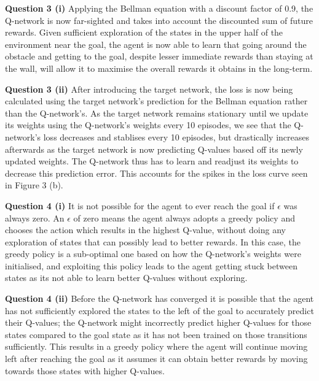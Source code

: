 \documentclass[12pt]{article}
\begin{document}
\vspace{2cm}
\textbf{Question 3 (i)}
Applying the Bellman equation with a discount factor of 0.9, the Q-network is now far-sighted and takes into account the discounted sum of future rewards. Given sufficient exploration of the states in the upper half of the environment near the goal, the agent is now able to learn that going around the obstacle and getting to the goal, despite lesser immediate rewards than staying at the wall, will allow it to maximise the overall rewards it obtains in the long-term.

\vspace{0.5cm}
\textbf{Question 3 (ii)}
After introducing the target network, the loss is now being calculated using the target network's prediction for the Bellman equation rather than the Q-network's. As the target network remains stationary until we update its weights using the Q-network's weights every 10 episodes, we see that the Q-network's loss decreases and stablises every 10 episodes, but drastically increases afterwards as the target network is now predicting Q-values based off its newly updated weights. The Q-network thus has to learn and readjust its weights to decrease this prediction error. This accounts for the spikes in the loss curve seen in Figure 3 (b).

\vspace{2cm}
\textbf{Question 4 (i)}
It is not possible for the agent to ever reach the goal if \(\epsilon\) was always zero. An \(\epsilon\) of zero means the agent always adopts a greedy policy and chooses the action which results in the highest Q-value, without doing any exploration of states that can possibly lead to better rewards. In this case, the greedy policy is a sub-optimal one based on how the Q-network's weights were initialised, and exploiting this policy leads to the agent getting stuck between states as its not able to learn better Q-values without exploring.

\vspace{0.5cm}
\textbf{Question 4 (ii)}
Before the Q-network has converged it is possible that the agent has not  sufficiently explored the states to the left of the goal to accurately predict their Q-values; the Q-network might incorrectly predict higher Q-values for those states compared to the goal state as it has not been trained on those transitions sufficiently. This results in a greedy policy where the agent will continue moving left after reaching the goal as it assumes it can obtain better rewards by moving towards those states with higher Q-values.
\end{document}

